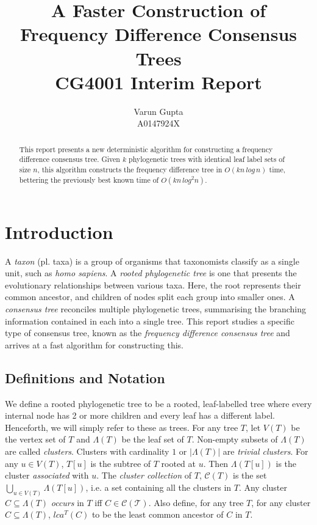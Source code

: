 \documentclass{article}
\title{A Faster Construction of Frequency Difference Consensus Trees\\CG4001 Interim Report}
\author{Varun Gupta\\A0147924X}
\newcommand{\leafset}{\Lambda}
\begin{document}
    \maketitle

    \begin{abstract}
        This report presents a new deterministic algorithm for constructing a frequency difference consensus tree. Given $k$ phylogenetic trees with identical leaf label sets of size $n$, this algorithm constructs the frequency difference tree in $O(kn\,log\,n)$ time, bettering the previously best known time of $O(kn\,log^2n)$.
    \end{abstract}

    \section{Introduction}
    \label{sec:introduction}

    A \textit{taxon} (pl. taxa) is a group of organisms that taxonomists classify as a single unit, such as \textit{homo sapiens}. A \textit{rooted phylogenetic tree} is one that presents the evolutionary relationships between various taxa. Here, the root represents their common ancestor, and children of nodes split each group into smaller ones. A \textit{consensus tree} reconciles multiple phylogenetic trees, summarising the branching information contained in each into a single tree. This report studies a specific type of consensus tree, known as the \textit{frequency difference consensus tree} and arrives at a fast algorithm for constructing this.

    \subsection{Definitions and Notation}
    We define a rooted phylogenetic tree to be a rooted, leaf-labelled tree where every internal node has 2 or more children and every leaf has a different label. Henceforth, we will simply refer to these as trees. For any tree $T$, let $V(T)$ be the vertex set of $T$ and $\leafset(T)$ be the leaf set of $T$. Non-empty subsets of $\leafset(T)$ are called \textit{clusters}. Clusters with cardinality $1$ or $|\leafset(T)|$ are \textit{trivial clusters}. For any $u \in V(T)$, $T[u]$ is the subtree of $T$ rooted at $u$. Then $\leafset(T[u])$ is the cluster \textit{associated} with $u$. The \textit{cluster collection} of $T$, $\mathcal{C}(T)$ is the set $\bigcup_{u \in V(T)} {\leafset(T[u])}$, i.e. a set containing all the clusters in $T$. Any cluster $C \subseteq \leafset(T)$ \textit{occurs} in $T$ iff $C \in \mathcal{C(T)}$. Also define, for any tree $T$, for any cluster $C \subseteq \leafset(T)$, $lca^T(C)$ to be the least common ancestor of $C$ in $T$.
\end{document}
